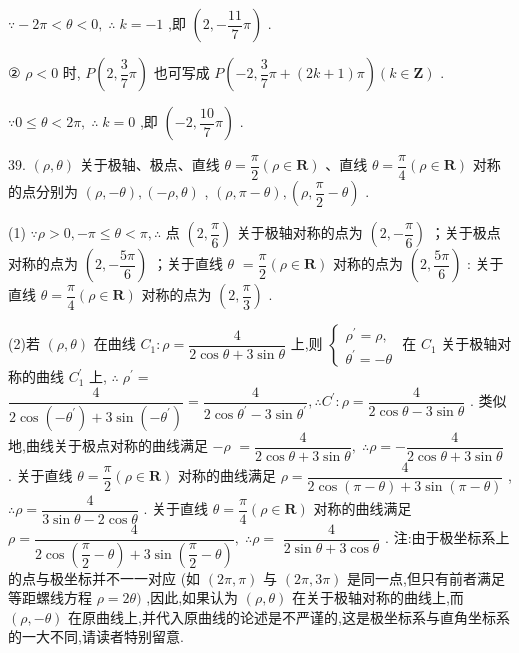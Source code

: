 $\because  - {2\pi } < \theta  < 0,\;\therefore \;k =  - 1$ ,即 $\left( {2, - \dfrac{11}{7}\pi }\right)$ .

② $\rho  < 0$ 时, $P\left( {2,\dfrac{3}{7}\pi }\right)$ 也可写成 $P\left( {-2,\dfrac{3}{7}\pi  + \left( {{2k} + 1}\right) \pi }\right) \left( {k \in  \mathbf{Z}}\right)$ .

$\because 0 \leq  \theta  < {2\pi },\;\therefore \;k = 0$ ,即 $\left( {-2,\dfrac{10}{7}\pi }\right)$ .

39. $\left( {\rho ,\theta }\right)$ 关于极轴、极点、直线 $\theta  = \dfrac{\pi }{2}\left( {\rho  \in  \mathbf{R}}\right)$ 、直线 $\theta  = \dfrac{\pi }{4}\left( {\rho  \in  \mathbf{R}}\right)$ 对称的点分别为 $\left( {\rho , - \theta }\right) ,\left( {-\rho ,\theta }\right)$ , $\left( {\rho ,\pi  - \theta }\right) ,\left( {\rho ,\dfrac{\pi }{2} - \theta }\right)$ .

(1) $\because \rho  > 0, - \pi  \leq  \theta  < \pi ,\therefore$ 点 $\left( {2,\dfrac{\pi }{6}}\right)$ 关于极轴对称的点为 $\left( {2, - \dfrac{\pi }{6}}\right)$ ；关于极点对称的点为 $\left( {2, - \dfrac{5\pi }{6}}\right)$ ；关于直线 $\theta$  $= \dfrac{\pi }{2}\left( {\rho  \in  \mathbf{R}}\right)$ 对称的点为 $\left( {2,\dfrac{5\pi }{6}}\right)$ : 关于直线 $\theta  = \dfrac{\pi }{4}\left( {\rho  \in  \mathbf{R}}\right)$ 对称的点为 $\left( {2,\dfrac{\pi }{3}}\right)$ .

(2)若 $\left( {\rho ,\theta }\right)$ 在曲线 ${C}_{1} : \rho  = \dfrac{4}{2\cos \theta  + 3\sin \theta }$ 上,则 $\left\{  \begin{array}{l} {\rho }^{\prime } = \rho , \\  {\theta }^{\prime } =  - \theta  \end{array}\right.$ 在 ${C}_{1}$ 关于极轴对称的曲线 ${C}_{1}^{\prime }$ 上, $\therefore \;{\rho }^{\prime } =$  $\dfrac{4}{2\cos \left( {-{\theta }^{\prime }}\right)  + 3\sin \left( {-{\theta }^{\prime }}\right) } = \dfrac{4}{2\cos {\theta }^{\prime } - 3\sin {\theta }^{\prime }},\therefore {C}^{\prime } : \rho  = \dfrac{4}{2\cos \theta  - 3\sin \theta }$ . 类似地,曲线关于极点对称的曲线满足 $- \rho$  $= \dfrac{4}{2\cos \theta  + 3\sin \theta },\;\therefore \rho  =  - \dfrac{4}{2\cos \theta  + 3\sin \theta }$ . 关于直线 $\theta  = \dfrac{\pi }{2}\left( {\rho  \in  \mathbf{R}}\right)$ 对称的曲线满足 $\rho  = \dfrac{4}{2\cos \left( {\pi  - \theta }\right)  + 3\sin \left( {\pi  - \theta }\right) }$ , $\therefore \rho  = \dfrac{4}{3\sin \theta  - 2\cos \theta }$ . 关于直线 $\theta  = \dfrac{\pi }{4}\left( {\rho  \in  \mathbf{R}}\right)$ 对称的曲线满足 $\rho  = \dfrac{4}{2\cos \left( {\dfrac{\pi }{2} - \theta }\right)  + 3\sin \left( {\dfrac{\pi }{2} - \theta }\right) },\;\therefore \rho  =$  $\dfrac{4}{2\sin \theta  + 3\cos \theta }$ . 注:由于极坐标系上的点与极坐标并不一一对应 (如 $\left( {{2\pi },\pi }\right)$ 与 $\left( {{2\pi },{3\pi }}\right)$ 是同一点,但只有前者满足等距螺线方程 $\rho  = {2\theta })$ ,因此,如果认为 $\left( {\rho ,\theta }\right)$ 在关于极轴对称的曲线上,而 $\left( {\rho , - \theta }\right)$ 在原曲线上,并代入原曲线的论述是不严谨的,这是极坐标系与直角坐标系的一大不同,请读者特别留意.

